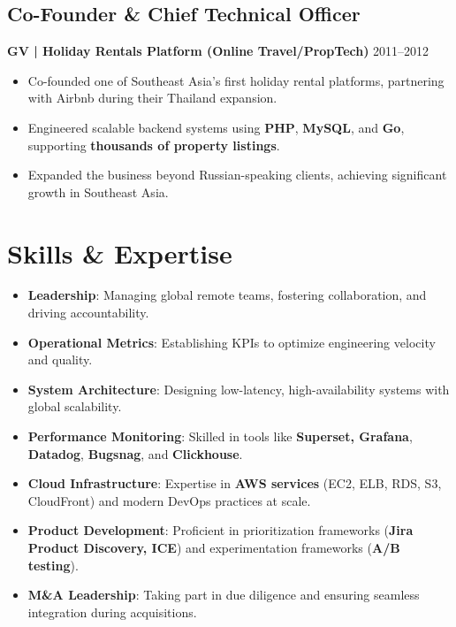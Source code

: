 \documentclass[11pt,a4paper]{article}
\begin{document}
\subsection*{Co-Founder \& Chief Technical Officer}
\textbf{GV | Holiday Rentals Platform (Online Travel/PropTech)} \hfill 2011--2012
\begin{itemize}
    \item Co-founded one of Southeast Asia’s first holiday rental platforms, partnering with Airbnb during their Thailand expansion.
    \item Engineered scalable backend systems using \textbf{PHP}, \textbf{MySQL}, and \textbf{Go}, supporting \textbf{thousands of property listings}.
    \item Expanded the business beyond Russian-speaking clients, achieving significant growth in Southeast Asia.
\end{itemize}

\section*{Skills \& Expertise}
\begin{itemize}
    \item \textbf{Leadership}: Managing global remote teams, fostering collaboration, and driving accountability.
    \item \textbf{Operational Metrics}: Establishing KPIs to optimize engineering velocity and quality.
    \item \textbf{System Architecture}: Designing low-latency, high-availability systems with global scalability.
    \item \textbf{Performance Monitoring}: Skilled in tools like \textbf{Superset, Grafana}, \textbf{Datadog}, \textbf{Bugsnag}, and \textbf{Clickhouse}.
    \item \textbf{Cloud Infrastructure}: Expertise in \textbf{AWS services} (EC2, ELB, RDS, S3, CloudFront) and modern DevOps practices at scale.
    \item \textbf{Product Development}: Proficient in prioritization frameworks (\textbf{Jira Product Discovery, ICE}) and experimentation frameworks (\textbf{A/B testing}).
    \item \textbf{M\&A Leadership}: Taking part in due diligence and ensuring seamless integration during acquisitions.
\end{itemize}
\end{document}
